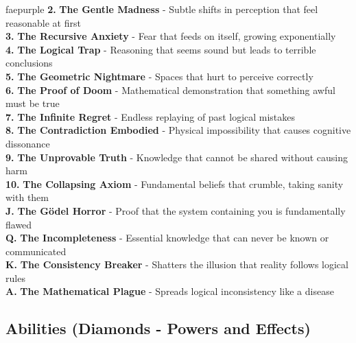 \documentclass[11pt]{article}
\begin{document}
\begin{campaignsection}{faepurple}
\textbf{2.} \textbf{The Gentle Madness} - Subtle shifts in perception that feel reasonable at first \\
\textbf{3.} \textbf{The Recursive Anxiety} - Fear that feeds on itself, growing exponentially \\
\textbf{4.} \textbf{The Logical Trap} - Reasoning that seems sound but leads to terrible conclusions \\
\textbf{5.} \textbf{The Geometric Nightmare} - Spaces that hurt to perceive correctly \\
\textbf{6.} \textbf{The Proof of Doom} - Mathematical demonstration that something awful must be true \\
\textbf{7.} \textbf{The Infinite Regret} - Endless replaying of past logical mistakes \\
\textbf{8.} \textbf{The Contradiction Embodied} - Physical impossibility that causes cognitive dissonance \\
\textbf{9.} \textbf{The Unprovable Truth} - Knowledge that cannot be shared without causing harm \\
\textbf{10.} \textbf{The Collapsing Axiom} - Fundamental beliefs that crumble, taking sanity with them \\
\textbf{J.} \textbf{The Gödel Horror} - Proof that the system containing you is fundamentally flawed \\
\textbf{Q.} \textbf{The Incompleteness} - Essential knowledge that can never be known or communicated \\
\textbf{K.} \textbf{The Consistency Breaker} - Shatters the illusion that reality follows logical rules \\
\textbf{A.} \textbf{The Mathematical Plague} - Spreads logical inconsistency like a disease

\subsection*{Abilities (Diamonds - Powers and Effects)}


\end{campaignsection}
\end{document}
